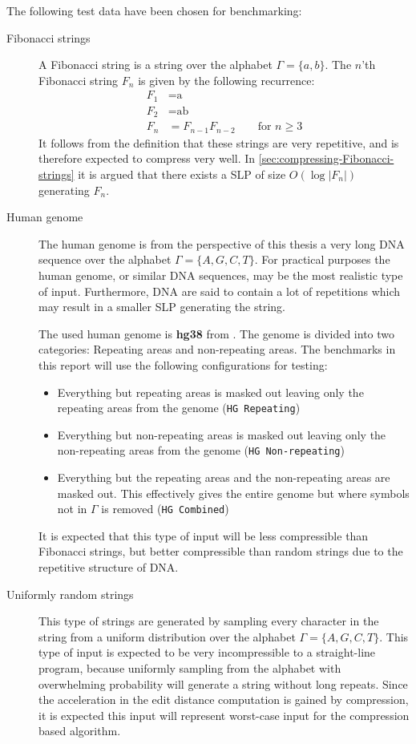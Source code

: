 \documentclass[twoside,11pt,openright]{report}
\begin{document}
The following test data have been chosen for benchmarking:
\begin{description}
  \item[Fibonacci strings] A Fibonacci string is a string over the alphabet $\Gamma = \{a,b\}$. The $n$'th Fibonacci string $F_n$ is given by the following recurrence:
    \begin{align*}
      F_1 &= \text{a} \\
      F_2 &= \text{ab} \\
      F_{n} &= F_{n - 1} F_{n - 2} \quad\quad \text{for } n \geq 3
    \end{align*}
    It follows from the definition that these strings are very repetitive, and is therefore expected to compress very well. In \cref{sec:compressing-Fibonacci-strings} it is argued that there exists a SLP of size $O(\log{|F_n|})$ generating $F_n$.
  \item[Human genome] The human genome is from the perspective of this thesis a very long DNA sequence over the alphabet $\Gamma = \{A,G,C,T\}$. For practical purposes the human genome, or similar DNA sequences, may be the most realistic type of input. Furthermore, DNA are said to contain a lot of repetitions which may result in a smaller SLP generating the string.

   The used human genome is \textbf{hg38} from \cite{HumanGenome}. The genome is divided into two categories: Repeating areas and non-repeating areas. The benchmarks in this report will use the following configurations for testing:
  \begin{itemize}
    \item Everything but repeating areas is masked out leaving only the repeating areas from the genome (\texttt{HG Repeating})
    \item Everything but non-repeating areas is masked out leaving only the non-repeating areas from the genome (\texttt{HG Non-repeating})
    \item Everything but the repeating areas and the non-repeating areas are masked out. This effectively gives the entire genome but where symbols not in $\Gamma$ is removed (\texttt{HG Combined})
  \end{itemize}
  It is expected that this type of input will be less compressible than Fibonacci strings, but better compressible than random strings due to the repetitive structure of DNA.

  \item[Uniformly random strings] This type of strings are generated by sampling every character in the string from a uniform distribution over the alphabet $\Gamma = \{A,G,C,T\}$. This type of input is expected to be very incompressible to a straight-line program, because uniformly sampling from the alphabet with overwhelming probability will generate a string without long repeats. Since the acceleration in the edit distance computation is gained by compression, it is expected this input will represent worst-case input for the compression based algorithm.
\end{description}
\end{document}
